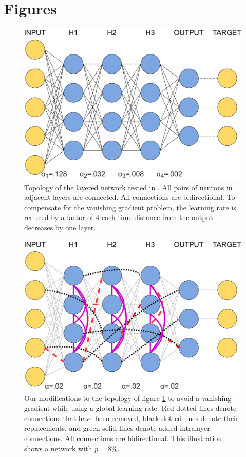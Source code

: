 \documentclass[utf8]{frontiersSCNS}
\begin{document}


\clearpage
\section*{Figures}

\begin{figure}[h!]
\begin{center}
\includegraphics[width=\textwidth]{figures/basic_topology_illustration.pdf}
\end{center}
\caption{Topology of the layered network tested in \citep{scellier17}. All pairs of neurons in adjacent layers are connected. All connections are bidirectional. To compensate for the vanishing gradient problem, the learning rate is reduced by a factor of 4 each time distance from the output decreases by one layer.} \label{fig:top_basic}
\end{figure}
\begin{figure}[h!]
\begin{center}
\includegraphics[width=\textwidth]{figures/topology_changes_illustration.pdf}
\end{center}
\caption{Our modifications to the topology of figure \ref{fig:top_basic} to avoid a vanishing gradient while using a global learning rate. Red dotted lines denote connections that have been removed, black dotted lines denote their replacements, and green solid lines denote added intralayer connections. All connections are bidirectional. This illustration shows a network with $p=8\%$.} \label{fig:top_sw}
\end{figure}
\end{document}
